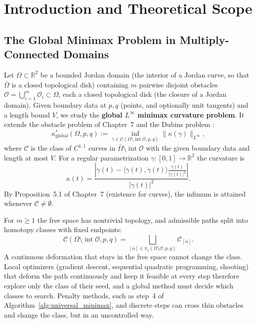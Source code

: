 \documentclass[11pt,reqno]{amsart}
\theoremstyle{definition}
\providecommand{\R}{\mathbb{R}}
\numberwithin{equation}{section}
\providecommand{\R}{\mathbb{R}}
\providecommand{\xref}[2]{#2}
\begin{document}
\maketitle

\tableofcontents
\newpage

\section{Introduction and Theoretical Scope}

\subsection{The Global Minimax Problem in Multiply-Connected Domains}
Let $\Omega \subset \R^2$ be a bounded Jordan domain (the interior of a Jordan curve, so that $\bar\Omega$ is a closed topological disk) containing $m$ pairwise disjoint obstacles $\mathcal{O} = \bigcup_{i=1}^m \mathcal{O}_i \subset \Omega$, each a closed topological disk (the closure of a Jordan domain). Given boundary data at $p, q$ (points, and optionally unit tangents) and a length bound $V$, we study the \textbf{global $L^\infty$ minimax curvature problem}. It extends the obstacle problem of Chapter~7 \cite{silvafilho2026minimax} and the Dubins problem \cite{dubins1957}:
\begin{equation}
\label{eq:global_minimax_problem}
\kappa^*_{\mathrm{global}}(\Omega, p, q) := \inf_{\gamma \in \mathcal{C}(\Omega \setminus \operatorname{int}\mathcal{O}, p, q)} \|\kappa(\gamma)\|_{L^\infty},
\end{equation}
where $\mathcal{C}$ is the class of $C^{1,1}$ curves in $\bar\Omega \setminus \operatorname{int}\mathcal{O}$ with the given boundary data and length at most $V$. For a regular parametrization $\gamma: [0, 1] \to \R^2$ the curvature is
\begin{equation}
\kappa(t) = \frac{|\ddot{\gamma}(t) - \langle \ddot{\gamma}(t), \dot{\gamma}(t) \rangle \frac{\dot{\gamma}(t)}{|\dot{\gamma}(t)|^2}|}{|\dot{\gamma}(t)|^2}.
\end{equation}
By Proposition~\xref{chap07:thm:existence}{5.1} of Chapter~7 (existence for curves), the infimum is attained whenever $\mathcal{C} \neq \emptyset$.

For $m \ge 1$ the free space has nontrivial topology, and admissible paths split into homotopy classes with fixed endpoints:
\begin{equation}
\mathcal{C}(\Omega \setminus \operatorname{int}\mathcal{O}, p, q) = \bigsqcup_{[\alpha] \in \pi_1(\Omega \setminus \mathcal{O}, p, q)} \mathcal{C}_{[\alpha]}.
\end{equation}
A continuous deformation that stays in the free space cannot change the class. Local optimizers (gradient descent, sequential quadratic programming, shooting) that deform the path continuously and keep it feasible at every step therefore explore only the class of their seed, and a global method must decide which classes to search. Penalty methods, such as step~4 of Algorithm~\ref{alg:universal_minimax}, and discrete steps can cross thin obstacles and change the class, but in an uncontrolled way.
\end{document}
